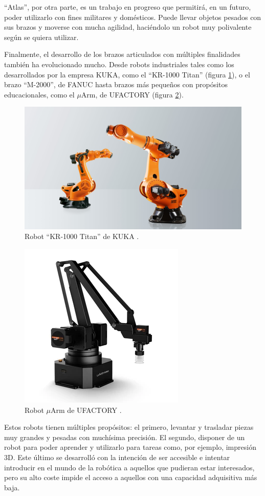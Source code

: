 ``Atlas'', por otra parte, es un trabajo en progreso que permitirá, en un futuro, poder
utilizarlo con fines militares y domésticos. Puede llevar objetos pesados con sus brazos
y moverse con mucha agilidad, haciéndolo un robot muy polivalente según se quiera utilizar.

Finalmente, el desarrollo de los brazos articulados con múltiples finalidades
también ha evolucionado mucho. Desde robots industriales tales como los desarrollados
por la empresa KUKA, como el ``KR-1000 Titan'' (figura \ref{fig:kuka}),
o el brazo ``M-2000'', de FANUC hasta brazos más pequeños con propósitos educacionales, como
el $\mu$Arm, de UFACTORY (figura \ref{fig:uarm}).

\begin{figure}[H]
    \centering
    \includegraphics[width=.75\linewidth]{pictures/kr1000.jpg}
    \caption{Robot ``KR-1000 Titan'' de KUKA \cite{KR1000Titana}.}
    \label{fig:kuka}
\end{figure}

\begin{figure}[H]
    \centering
    \includegraphics[width=.5\linewidth]{pictures/uarm.png}
    \caption{Robot $\mu$Arm de UFACTORY \cite{UFACTORYOfficialWebsitea}.}
    \label{fig:uarm}
\end{figure}

Estos robots tienen múltiples propósitos: el primero, levantar y trasladar piezas
muy grandes y pesadas con muchísima precisión. El segundo, disponer de un robot
para poder aprender y utilizarlo para tareas como, por ejemplo, impresión 3D. 
Este último se desarrolló con la intención de ser accesible e intentar introducir en el mundo
de la robótica a aquellos que pudieran estar interesados, pero su alto coste impide
el acceso a aquellos con una capacidad adquisitiva más baja.